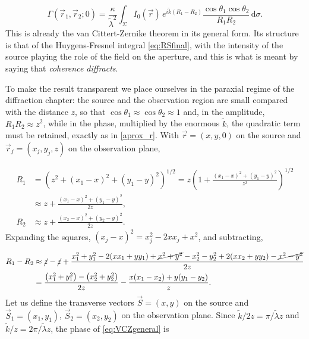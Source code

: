 		\begin{equation}\label{eq:VCZgeneral}
			\Gamma(\vec{r}_{1},\vec{r}_{2};0) = \frac{\kappa}{\tilde{\lambda}^{2}}\int_{\Sigma}I_{0}(\vec{r})\,e^{i\tilde{k}\left(R_{1}-R_{2}\right)}\frac{\cos\theta_{1}\cos\theta_{2}}{R_{1}R_{2}}\,\mathrm{d}\sigma .
		\end{equation}
		This is already the van Cittert-Zernike theorem in its general form. Its structure is
		that of the Huygens-Fresnel integral \eqref{eq:RSfinal}, with the intensity of the source
		playing the role of the field on the aperture, and this is what is meant by saying that
		\textit{coherence diffracts}.

		To make the result transparent we place ourselves in the paraxial regime of the
		diffraction chapter: the source and the observation region are small compared with the
		distance $z$, so that $\cos\theta_{1}\approx\cos\theta_{2}\approx1$ and, in the amplitude,
		$R_{1}R_{2}\approx z^{2}$, while in the phase, multiplied by the enormous $\tilde{k}$, the
		quadratic term must be retained, exactly as in \eqref{aprox_r}. With $\vec{r}=(x,y,0)$ on
		the source and $\vec{r}_{j}=(x_{j},y_{j},z)$ on the observation plane,

		\begin{align}
			R_{1} &= \left(z^{2}+(x_{1}-x)^{2}+(y_{1}-y)^{2}\right)^{1/2} = z\left(1+\frac{(x_{1}-x)^{2}+(y_{1}-y)^{2}}{z^{2}}\right)^{1/2} \nonumber\\
			&\approx z+\frac{(x_{1}-x)^{2}+(y_{1}-y)^{2}}{2z},\\
			R_{2} &\approx z+\frac{(x_{2}-x)^{2}+(y_{2}-y)^{2}}{2z}.
		\end{align}
		Expanding the squares, $(x_{j}-x)^{2}=x_{j}^{2}-2xx_{j}+x^{2}$, and subtracting,

		\begin{align}
			R_{1}-R_{2} &\approx \cancel{z}-\cancel{z}+\frac{x_{1}^{2}+y_{1}^{2}-2(xx_{1}+yy_{1})+\cancel{x^{2}+y^{2}}-x_{2}^{2}-y_{2}^{2}+2(xx_{2}+yy_{2})-\cancel{x^{2}-y^{2}}}{2z} \nonumber\\
			&= \frac{\left(x_{1}^{2}+y_{1}^{2}\right)-\left(x_{2}^{2}+y_{2}^{2}\right)}{2z}-\frac{x(x_{1}-x_{2})+y(y_{1}-y_{2})}{z}.
		\end{align}
		Let us define the transverse vectors $\vec{S}=(x,y)$ on the source and
		$\vec{S}_{1}=(x_{1},y_{1})$, $\vec{S}_{2}=(x_{2},y_{2})$ on the observation plane. Since
		$\tilde{k}/2z=\pi/\tilde{\lambda}z$ and $\tilde{k}/z=2\pi/\tilde{\lambda}z$, the phase of
		\eqref{eq:VCZgeneral} is

